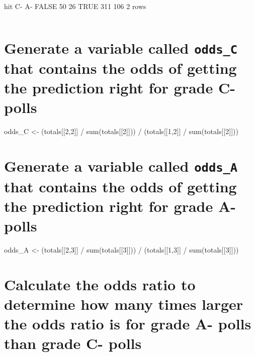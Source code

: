 \documentclass[
]{article}
\begin{document}
\begin{verbatim}
\end{verbatim}

hit C- A- FALSE 50 26 TRUE 311 106 2 rows

\begin{verbatim}
\end{verbatim}

\hypertarget{generate-a-variable-called-odds_c-that-contains-the-odds-of-getting-the-prediction-right-for-grade-c--polls}{%
\section{\texorpdfstring{Generate a variable called \texttt{odds\_C}
that contains the odds of getting the prediction right for grade C-
polls}{Generate a variable called odds\_C that contains the odds of getting the prediction right for grade C- polls}}\label{generate-a-variable-called-odds_c-that-contains-the-odds-of-getting-the-prediction-right-for-grade-c--polls}}

odds\_C \textless- (totals{[}{[}2,2{]}{]} / sum(totals{[}{[}2{]}{]})) /
(totals{[}{[}1,2{]}{]} / sum(totals{[}{[}2{]}{]}))

\hypertarget{generate-a-variable-called-odds_a-that-contains-the-odds-of-getting-the-prediction-right-for-grade-a--polls}{%
\section{\texorpdfstring{Generate a variable called \texttt{odds\_A}
that contains the odds of getting the prediction right for grade A-
polls}{Generate a variable called odds\_A that contains the odds of getting the prediction right for grade A- polls}}\label{generate-a-variable-called-odds_a-that-contains-the-odds-of-getting-the-prediction-right-for-grade-a--polls}}

odds\_A \textless- (totals{[}{[}2,3{]}{]} / sum(totals{[}{[}3{]}{]})) /
(totals{[}{[}1,3{]}{]} / sum(totals{[}{[}3{]}{]}))

\hypertarget{calculate-the-odds-ratio-to-determine-how-many-times-larger-the-odds-ratio-is-for-grade-a--polls-than-grade-c--polls}{%
\section{Calculate the odds ratio to determine how many times larger the
odds ratio is for grade A- polls than grade C-
polls}\label{calculate-the-odds-ratio-to-determine-how-many-times-larger-the-odds-ratio-is-for-grade-a--polls-than-grade-c--polls}}
\end{document}
